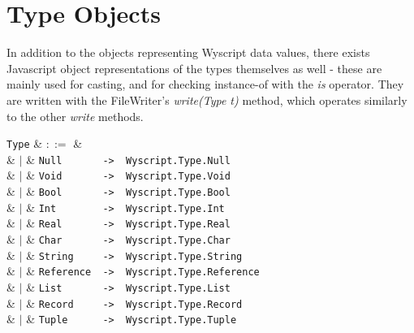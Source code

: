 
\section{Type Objects}
\label{c_types_type_objects}

In addition to the objects representing Wyscript data values, there exists Javascript object representations of the types themselves as well - these are mainly used for casting, and for checking instance-of with the {\em is} operator. They are written with the FileWriter's {\em write(Type t)} method, which operates similarly to the other {\em write} methods.


\begin{syntax}
  \verb+Type+ & $::=$ & \\
  & $|$ & \verb+Null       ->  Wyscript.Type.Null+\\
  & $|$ & \verb+Void       ->  Wyscript.Type.Void+\\
  & $|$ & \verb+Bool       ->  Wyscript.Type.Bool+\\
  & $|$ & \verb+Int        ->  Wyscript.Type.Int+\\
  & $|$ & \verb+Real       ->  Wyscript.Type.Real+\\
  & $|$ & \verb+Char       ->  Wyscript.Type.Char+\\
  & $|$ & \verb+String     ->  Wyscript.Type.String+\\
  & $|$ & \verb+Reference  ->  Wyscript.Type.Reference+\\
  & $|$ & \verb+List       ->  Wyscript.Type.List+\\
  & $|$ & \verb+Record     ->  Wyscript.Type.Record+\\
  & $|$ & \verb+Tuple      ->  Wyscript.Type.Tuple+\\
\end{syntax}
